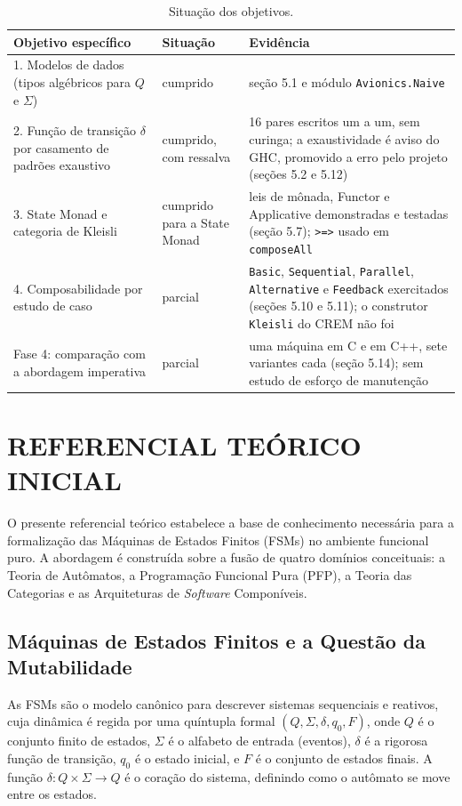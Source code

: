 \documentclass[12pt,a4paper]{article}
\begin{document}
\begin{table}[h]
\centering
\footnotesize
\begin{tabular}{|p{4.3cm}|p{2.1cm}|p{8.0cm}|}
\hline
Objetivo específico & Situação & Evidência \\
\hline
1. Modelos de dados (tipos algébricos para $Q$ e $\Sigma$) & cumprido & seção 5.1 e módulo \texttt{Avionics.Naive} \\
\hline
2. Função de transição $\delta$ por casamento de padrões exaustivo & cumprido, com ressalva & 16 pares escritos um a um, sem curinga; a exaustividade é aviso do GHC, promovido a erro pelo projeto (seções 5.2 e 5.12) \\
\hline
3. State Monad e categoria de Kleisli & cumprido para a State Monad & leis de mônada, Functor e Applicative demonstradas e testadas (seção 5.7); \texttt{>=>} usado em \texttt{composeAll} \\
\hline
4. Composabilidade por estudo de caso & parcial & \texttt{Basic}, \texttt{Sequential}, \texttt{Parallel}, \texttt{Alternative} e \texttt{Feedback} exercitados (seções 5.10 e 5.11); o construtor \texttt{Kleisli} do CREM não foi \\
\hline
Fase 4: comparação com a abordagem imperativa & parcial & uma máquina em C e em C++, sete variantes cada (seção 5.14); sem estudo de esforço de manutenção \\
\hline
\end{tabular}
\caption{Situação dos objetivos.}
\label{tab:objetivos}
\end{table}

\section{REFERENCIAL TEÓRICO INICIAL}
O presente referencial teórico estabelece a base de conhecimento necessária para a formalização das Máquinas de Estados Finitos (FSMs) no ambiente funcional puro. A abordagem é construída sobre a fusão de quatro domínios conceituais: a Teoria de Autômatos, a Programação Funcional Pura (PFP), a Teoria das Categorias e as Arquiteturas de \textit{Software} Componíveis.

\subsection{Máquinas de Estados Finitos e a Questão da Mutabilidade}

As FSMs são o modelo canônico para descrever sistemas sequenciais e reativos, cuja dinâmica é regida por uma quíntupla formal $(Q, \Sigma, \delta, q_0, F)$, onde $Q$ é o conjunto finito de estados, $\Sigma$ é o alfabeto de entrada (eventos), $\delta$ é a rigorosa função de transição, $q_0$ é o estado inicial, e $F$ é o conjunto de estados finais. A função $\delta: Q \times \Sigma \to Q$ é o coração do sistema, definindo como o autômato se move entre os estados.
\end{document}
